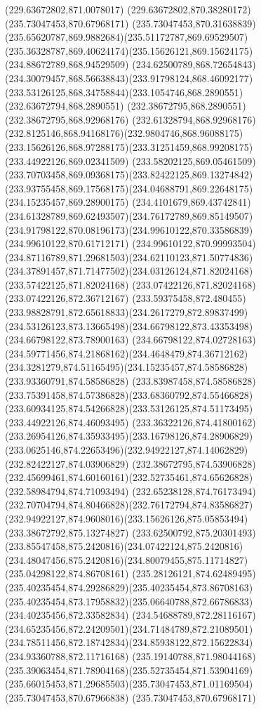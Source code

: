 {{	\lineto(229.63672802,871.0078017)
	\lineto(229.63672802,870.38280172)
	\closepath
	\moveto(235.73047453,870.67968171)
	\curveto(235.73047453,870.31638839)(235.65620787,869.9882684)(235.51172787,869.69529507)
	\curveto(235.36328787,869.40624174)(235.15626121,869.15624175)(234.88672789,868.94529509)
	\curveto(234.62500789,868.72654843)(234.30079457,868.56638843)(233.91798124,868.46092177)
	\curveto(233.53126125,868.34758844)(233.1054746,868.2890551)(232.63672794,868.2890551)
	\lineto(232.38672795,868.2890551)
	\lineto(232.38672795,868.92968176)
	\curveto(232.61328794,868.92968176)(232.8125146,868.94168176)(232.9804746,868.96088175)
	\curveto(233.15626126,868.97288175)(233.31251459,868.99208175)(233.44922126,869.02341509)
	\curveto(233.58202125,869.05461509)(233.70703458,869.09368175)(233.82422125,869.13274842)
	\curveto(233.93755458,869.17568175)(234.04688791,869.22648175)(234.15235457,869.28900175)
	\curveto(234.4101679,869.43742841)(234.61328789,869.62493507)(234.76172789,869.85149507)
	\curveto(234.91798122,870.08196173)(234.99610122,870.33586839)(234.99610122,870.61712171)
	\curveto(234.99610122,870.99993504)(234.87116789,871.29681503)(234.62110123,871.50774836)
	\curveto(234.37891457,871.71477502)(234.03126124,871.82024168)(233.57422125,871.82024168)
	\lineto(233.07422126,871.82024168)
	\lineto(233.07422126,872.36712167)
	\curveto(233.59375458,872.480455)(233.98828791,872.65618833)(234.2617279,872.89837499)
	\curveto(234.53126123,873.13665498)(234.66798122,873.43353498)(234.66798122,873.78900163)
	\curveto(234.66798122,874.02728163)(234.59771456,874.21868162)(234.4648479,874.36712162)
	\curveto(234.3281279,874.51165495)(234.15235457,874.58586828)(233.93360791,874.58586828)
	\curveto(233.83987458,874.58586828)(233.75391458,874.57386828)(233.68360792,874.55466828)
	\curveto(233.60934125,874.54266828)(233.53126125,874.51173495)(233.44922126,874.46093495)
	\curveto(233.36322126,874.41800162)(233.26954126,874.35933495)(233.16798126,874.28906829)
	\curveto(233.0625146,874.22653496)(232.94922127,874.14062829)(232.82422127,874.03906829)
	\lineto(232.38672795,874.53906828)
	\curveto(232.45699461,874.60160161)(232.52735461,874.65626828)(232.58984794,874.71093494)
	\curveto(232.65238128,874.76173494)(232.70704794,874.80466828)(232.76172794,874.83586827)
	\curveto(232.94922127,874.9608016)(233.15626126,875.05853494)(233.38672792,875.13274827)
	\curveto(233.62500792,875.20301493)(233.85547458,875.2420816)(234.07422124,875.2420816)
	\curveto(234.48047456,875.2420816)(234.80079455,875.11714827)(235.04298122,874.86708161)
	\curveto(235.28126121,874.62489495)(235.40235454,874.29286829)(235.40235454,873.86708163)
	\curveto(235.40235454,873.17958832)(235.06640788,872.66786833)(234.40235456,872.33582834)
	\curveto(234.54688789,872.28116167)(234.65235456,872.24209501)(234.71484789,872.21089501)
	\curveto(234.78511456,872.18742834)(234.85938122,872.15622834)(234.93360788,872.11716168)
	\curveto(235.19140788,871.98044168)(235.39063454,871.78904168)(235.52735454,871.53904169)
	\curveto(235.66015453,871.29685503)(235.73047453,871.01169504)(235.73047453,870.67966838)
	\closepath
	\moveto(235.73047453,870.67968171)
}
}

